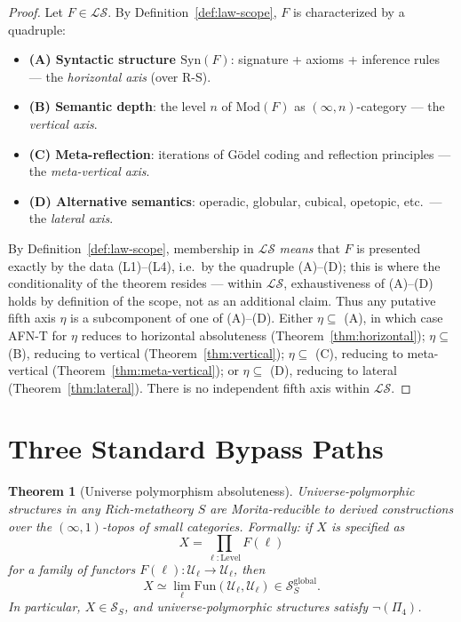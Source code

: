 \documentclass[11pt]{article}
\theoremstyle{plain}
\newtheorem{theorem}{Theorem}[section]
\theoremstyle{definition}
\newcommand{\cS}{\mathcal{S}}
\newcommand{\cL}{\mathcal{L}}
\newcommand{\Fun}{\mathrm{Fun}}
\newcommand{\Syn}{\mathrm{Syn}}
\newcommand{\Mod}{\mathrm{Mod}}
\newcommand{\cU}{\mathcal{U}}
\begin{document}
\begin{proof}
Let $F \in \cL\cS$. By Definition~\ref{def:law-scope}, $F$ is characterized by a quadruple:
\begin{itemize}
\item \textbf{(A) Syntactic structure $\Syn(F)$}: signature + axioms + inference rules --- the \emph{horizontal axis} (over R-S).
\item \textbf{(B) Semantic depth}: the level $n$ of $\Mod(F)$ as $(\infty, n)$-category --- the \emph{vertical axis}.
\item \textbf{(C) Meta-reflection}: iterations of G\"odel coding and reflection principles --- the \emph{meta-vertical axis}.
\item \textbf{(D) Alternative semantics}: operadic, globular, cubical, opetopic, etc.\ --- the \emph{lateral axis}.
\end{itemize}
By Definition~\ref{def:law-scope}, membership in $\cL\cS$ \emph{means} that $F$ is presented exactly by the data (L1)--(L4), i.e.\ by the quadruple (A)--(D); this is where the conditionality of the theorem resides --- within $\cL\cS$, exhaustiveness of (A)--(D) holds by definition of the scope, not as an additional claim. Thus any putative fifth axis $\eta$ is a subcomponent of one of (A)--(D). Either $\eta \subseteq$ (A), in which case AFN-T for $\eta$ reduces to horizontal absoluteness (Theorem~\ref{thm:horizontal}); $\eta \subseteq$ (B), reducing to vertical (Theorem~\ref{thm:vertical}); $\eta \subseteq$ (C), reducing to meta-vertical (Theorem~\ref{thm:meta-vertical}); or $\eta \subseteq$ (D), reducing to lateral (Theorem~\ref{thm:lateral}). There is no independent fifth axis within $\cL\cS$.
\end{proof}

\section{Three Standard Bypass Paths}\label{sec:bypass}

\begin{theorem}[Universe polymorphism absoluteness]\label{thm:universe}
Universe-polymorphic structures in any Rich-metatheory $S$ are Morita-reducible to derived constructions over the $(\infty, 1)$-topos of small categories. Formally: if $X$ is specified as
\[ X = \prod_{\ell : \mathrm{Level}} F(\ell) \]
for a family of functors $F(\ell) : \cU_\ell \to \cU_\ell$, then
\[ X \simeq \lim_\ell \Fun(\cU_\ell, \cU_\ell) \in \cS_S^{\mathrm{global}}. \]
In particular, $X \in \cS_S$, and universe-polymorphic structures satisfy $\neg (\Pi_4)$.
\end{theorem}
\end{document}
